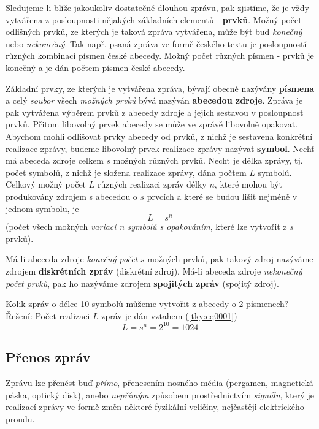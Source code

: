     Sledujeme-li blíže jakoukoliv dostatečně dlouhou zprávu, pak zjistíme, že je vždy vytvářena z 
    posloupnosti nějakých základních elementů - \textbf{prvků}. Možný počet odlišných prvků, ze 
    kterých je taková zpráva vytvářena, může být bud \emph{konečný} nebo \emph{nekonečný}. Tak 
    např. psaná zpráva ve formě českého textu je posloupností různých kombinací písmen české 
    abecedy. Možný počet různých písmen - prvků je konečný a je dán počtem písmen české abecedy.
      
    Základní prvky, ze kterých je vytvářena zpráva, bývají obecně nazývány \textbf{písmena} a celý 
    \emph{soubor} všech \emph{možných prvků} bývá nazýván \textbf{abecedou zdroje}. Zpráva je pak 
    vytvářena výběrem prvků z abecedy zdroje a jejich sestavou v posloupnost prvků. Přitom 
    libovolný prvek abecedy se může ve zprávě libovolně opakovat. Abychom mohli odlišovat prvky 
    abecedy od prvků, z nichž je sestavena konkrétní realizace zprávy, budeme libovolný prvek 
    realizace zprávy nazývat \textbf{symbol}. Nechť má abeceda zdroje celkem \(s\) možných různých 
    prvků. Nechť je délka zprávy, tj. počet symbolů, z nichž je složena realizace zprávy, dána 
    počtem \(L\) symbolů. Celkový možný počet \(L\) různých realizaci zpráv délky \(n\), které 
    mohou být produkovány zdrojem s abecedou o \(s\) prvcích a které se budou lišit nejméně v 
    jednom symbolu, je
    \begin{equation}\label{tky:eq0001}
      L = s^n
    \end{equation}
    (počet všech možných \emph{variací n symbolů s opakováním}, které lze vytvořit z \(s\) prvků).
    
    Má-li abeceda zdroje \emph{konečný počet} \(s\) možných prvků, pak takový zdroj nazýváme 
    zdrojem \textbf{diskrétních zpráv} (diskrétní zdroj). Má-li abeceda zdroje \emph{nekonečný 
    počet prvků}, pak ho nazýváme zdrojem \textbf{spojitých zpráv} (spojitý zdroj).
    
    \begin{example}
      Kolik zpráv o délce \num{10} symbolů můžeme vytvořit z abecedy o \num{2} písmenech?
      \newline
      Řešení: Počet realizaci \(L\) zpráv je dán vztahem (\ref{tky:eq0001})
      \begin{equation*}
        L = s^n = 2^{10} = 1024
      \end{equation*}      
    \end{example}
      
    \subsection{Přenos zpráv}
      Zprávu lze přenést buď \emph{přímo}, přenesením nosného média (pergamen, magnetická páska, 
      optický disk), anebo \emph{nepřímým} způsobem prostřednictvím \emph{signálu}, který je 
      realizací zprávy ve formě změn některé fyzikální veličiny, nejčastěji elektrického proudu.
      
